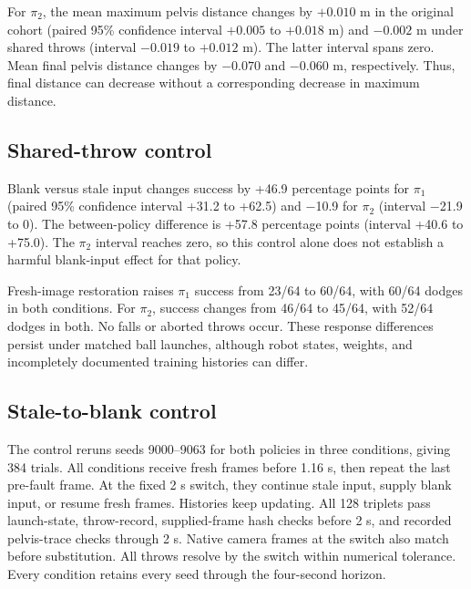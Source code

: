 For $\pi_2$, the mean maximum pelvis distance changes by $+0.010$ m in the
original cohort (paired 95\% confidence interval $+0.005$ to $+0.018$ m) and
$-0.002$ m under shared throws (interval $-0.019$ to $+0.012$ m). The latter
interval spans zero. Mean final pelvis distance changes by $-0.070$ and
$-0.060$ m, respectively. Thus, final distance can decrease without a
corresponding decrease in maximum distance.

\subsection{Shared-throw control}
\begin{table}[t]
\caption{Shared-throw control. Counts out of 64 per condition; falls and aborted
throws are zero. Fresh-image restoration occurs at 2 s. Initial ball positions
and velocities match across policies; robot states can differ.}
\label{tab:common}\centering\footnotesize

\end{table}
Blank versus stale input changes success by +46.9 percentage points for
$\pi_1$ (paired 95\% confidence interval +31.2 to +62.5) and $-$10.9 for
$\pi_2$ (interval $-$21.9 to 0). The between-policy difference is +57.8
percentage points (interval +40.6 to +75.0). The $\pi_2$ interval reaches zero,
so this control alone does not establish a harmful blank-input effect for
that policy.

Fresh-image restoration raises $\pi_1$ success from 23/64 to 60/64, with 60/64
dodges in both conditions. For $\pi_2$, success changes from 46/64 to 45/64,
with 52/64 dodges in both. No falls or aborted throws occur. These response
differences persist under matched ball launches, although robot states, weights,
and incompletely documented training histories can differ.

\subsection{Stale-to-blank control}
The control reruns seeds 9000--9063 for both policies in three conditions,
giving 384 trials. All conditions receive fresh frames before 1.16 s, then
repeat the last pre-fault frame. At the fixed 2 s switch, they continue stale
input, supply blank input, or resume fresh frames. Histories keep updating.
All 128 triplets pass launch-state, throw-record, supplied-frame hash checks
before 2 s, and recorded pelvis-trace checks through 2 s. Native camera frames
at the switch also match before substitution. All throws resolve by the switch
within numerical tolerance. Every condition retains every seed through the
four-second horizon.


